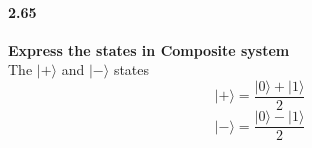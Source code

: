 
\paragraph{2.65} \textbf{Express the states in Composite system} \\%
The $|+\rangle$ and $|-\rangle$ states
$$ |+\rangle = \frac{|0\rangle + |1\rangle}{2}$$
$$ |-\rangle = \frac{|0\rangle - |1\rangle}{2}$$

